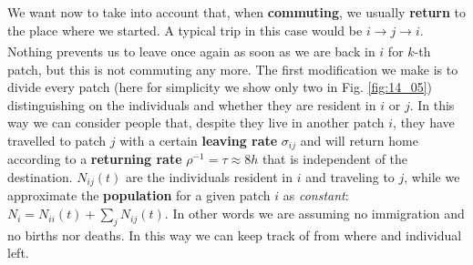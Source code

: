 \documentclass[../main/main.tex]{subfiles}
\begin{document}
We want now to take into account that, when \textbf{commuting}, we usually \textbf{return} to the place where we started. A typical trip in this case would be $i \xrightarrow{} j \xrightarrow[]{} i$. Nothing prevents us to leave once again as soon as we are back in $i$ for $k$-th patch, but this is not commuting any more. The first modification we make is to divide every patch (here for simplicity we show only two in Fig. \ref{fig:14_05}) distinguishing on the individuals and whether they are resident in $i$ or $j$. In this way we can consider people that, despite they live in another patch $i$, they have travelled to patch $j$ with a certain \textbf{leaving rate} $\sigma_{ij}$ and will return home according to a \textbf{returning rate} $\rho^{-1} = \tau \approx 8h$
that is independent of the destination. $N_{ij}(t)$ are the individuals resident in $i$ and traveling to $j$, while we approximate the \textbf{population} for a given patch $i$ as \textit{constant}: $N_i = N_{ii}(t) + \sum_{j} N_{ij}(t)$. In other words we are assuming no immigration and no births nor deaths. In this way we can keep track of from where and individual left.
\end{document}
